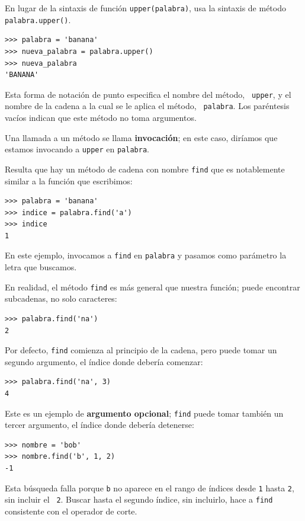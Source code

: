 \documentclass[10pt]{book}
\begin{document}
En lugar de la sintaxis de función {\tt upper(palabra)}, usa
la sintaxis de método {\tt palabra.upper()}.

\begin{verbatim}
>>> palabra = 'banana'
>>> nueva_palabra = palabra.upper()
>>> nueva_palabra
'BANANA'
\end{verbatim}
%
Esta forma de notación de punto especifica el nombre del método, {\tt
upper}, y el nombre de la cadena a la cual se le aplica el método, {\tt
palabra}.  Los paréntesis vacíos indican que este método no toma
argumentos.

Una llamada a un método se llama {\bf invocación}; en este caso,
diríamos que estamos invocando a {\tt upper} en {\tt palabra}.

Resulta que hay un método de cadena con nombre {\tt find} que
es notablemente similar a la función que escribimos:

\begin{verbatim}
>>> palabra = 'banana'
>>> indice = palabra.find('a')
>>> indice
1
\end{verbatim}
%
En este ejemplo, invocamos a {\tt find} en {\tt palabra} y pasamos
como parámetro la letra que buscamos.

En realidad, el método {\tt find} es más general que nuestra función;
puede encontrar subcadenas, no solo caracteres:

\begin{verbatim}
>>> palabra.find('na')
2
\end{verbatim}
%
Por defecto, {\tt find} comienza al principio de la cadena, pero
puede tomar un segundo argumento, el índice donde debería comenzar:

\begin{verbatim}
>>> palabra.find('na', 3)
4
\end{verbatim}
%
Este es un ejemplo de {\bf argumento opcional};
{\tt find} puede
tomar también un tercer argumento, el índice donde debería detenerse:

\begin{verbatim}
>>> nombre = 'bob'
>>> nombre.find('b', 1, 2)
-1
\end{verbatim}
%
Esta búsqueda falla porque {\tt b} no
aparece en el rango de índices desde {\tt 1} hasta {\tt 2}, sin incluir el {\tt
2}.  Buscar hasta el segundo índice, sin incluirlo, hace a
{\tt find} consistente con el operador de corte.
\end{document}
